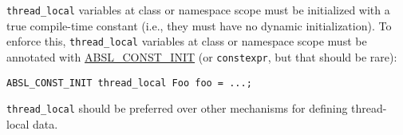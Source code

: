 \texttt{thread_local} variables at class or namespace scope must be initialized with a true compile-time constant (i.e., they must have no dynamic initialization). To enforce this, \texttt{thread_local} variables at class or namespace scope must be annotated with \href{https://github.com/abseil/abseil-cpp/blob/master/absl/base/attributes.h}{ABSL\_CONST\_INIT} (or \texttt{constexpr}, but that should be rare):
\begin{verbatim}
ABSL_CONST_INIT thread_local Foo foo = ...;
\end{verbatim}

\texttt{thread_local} should be preferred over other mechanisms for defining thread-local data.

